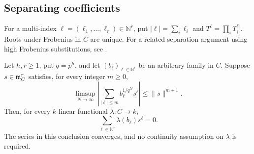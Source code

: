\subsection{Separating coefficients}

For a multi-index $\ell=(\ell_1,\ldots,\ell_r)\in\mathbb N^r$, put
$|\ell|=\sum_i\ell_i$ and $T^\ell=\prod_i T_i^{\ell_i}$. Roots under
Frobenius in $C$ are unique.
For a related separation argument using high Frobenius substitutions,
see \cite[Proposition~3.1]{Chai08}.

\begin{lemma}\label{formal:separation}
Let $h,r\geq1$, put $q=p^h$, and let $(b_\ell)_{\ell\in\mathbb N^r}$
be an arbitrary family in $C$. Suppose $s\in\mathfrak m_C^r$ satisfies, for
every integer $m\geq0$,
\begin{equation}\label{formal:root-bound}
  \limsup_{N\longrightarrow\infty}
  \left|\sum_{|\ell|\leq m} b_\ell^{1/q^N}s^\ell\right|
  \leq \|s\|^{m+1}.
\end{equation}
Then, for every $k$-linear functional $\lambda:C\to k$,
\[
  \sum_{\ell\in\mathbb N^r}\lambda(b_\ell)s^\ell=0.
\]
The series in this conclusion converges, and no continuity assumption
on $\lambda$ is required.
\end{lemma}

